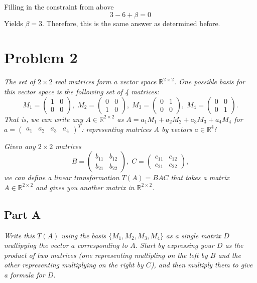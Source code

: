 \documentclass{article}
\begin{document}
\bigbreak

Filling in the constraint from above
$$ 3 - 6 + \beta = 0 $$
Yields $ \beta = 3 $. Therefore, this is the same answer as determined
before.

\section*{Problem 2}

\textit{The set of $2\times 2$ real matrices form a vector space
$\mathbb{R}^{2\times2}$. One possible basis for this vector space is the
following set of 4 matrices:}
$$ M_1 = \begin{pmatrix}
    1 & 0 \\
    0 & 0
\end{pmatrix}, \; M_2 = \begin{pmatrix}
    0 & 0 \\
    1 & 0
\end{pmatrix}, \; M_3 = \begin{pmatrix}
    0 & 1 \\
    0 & 0
\end{pmatrix}, \; M_4 = \begin{pmatrix}
    0 & 0 \\
    0 & 1
\end{pmatrix}. $$
\textit{That is, we can write any $A \in \mathbb{R}^{2\times2}$ as $A = a_1
M_1 + a_2 M_2 + a_3 M_3 + a_4 M_4$ for $a = \begin{pmatrix} a_1 & a_2 & a_3
& a_4 \end{pmatrix}^T$: representing matrices $A$ by vectors $a \in
\mathbb{R}^4$!}

\textit{Given any $2\times 2$ matrices}
$$ B = \begin{pmatrix}
    b_{11} & b_{12} \\
    b_{21} & b_{22}
\end{pmatrix}, \; C = \begin{pmatrix}
    c_{11} & c_{12} \\
    c_{21} & c_{22}
\end{pmatrix}, $$
\textit{we can define a linear transformation $T(A) = BAC$ that takes a
matrix $A \in \mathbb{R}^{2\times2}$ and gives you another matrix in
$\mathbb{R}^{2\times2}$.}

\subsection*{Part A}

\textit{Write this $T(A)$ using the basis $\{ M_1, M_2, M_3, M_4 \}$ as a
single matrix $D$ multipying the vector $a$ corresponding to $A$. Start by
expressing your $D$ as the product of two matrices (one representing
multipling on the left by $B$ and the other representing multiplying on the
right by $C$), and then multiply them to give a formula for $D$.}
\end{document}
